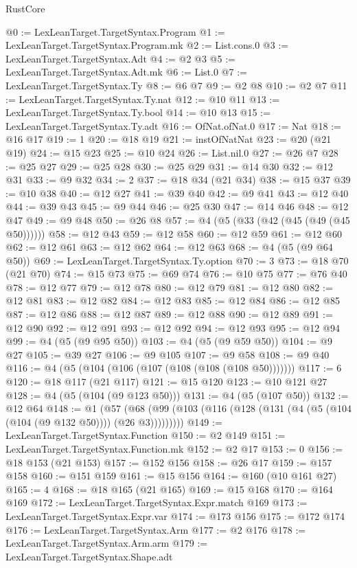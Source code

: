 \begin{lexlean}{RustCore}
\begin{coremodule}
@0 := LexLeanTarget.TargetSyntax.Program
@1 := LexLeanTarget.TargetSyntax.Program.mk
@2 := List.cons.{0}
@3 := LexLeanTarget.TargetSyntax.Adt
@4 := @2 @3
@5 := LexLeanTarget.TargetSyntax.Adt.mk
@6 := List.{0}
@7 := LexLeanTarget.TargetSyntax.Ty
@8 := @6 @7
@9 := @2 @8
@10 := @2 @7
@11 := LexLeanTarget.TargetSyntax.Ty.nat
@12 := @10 @11
@13 := LexLeanTarget.TargetSyntax.Ty.bool
@14 := @10 @13
@15 := LexLeanTarget.TargetSyntax.Ty.adt
@16 := OfNat.ofNat.{0}
@17 := Nat
@18 := @16 @17
@19 := 1
@20 := @18 @19
@21 := instOfNatNat
@23 := @20 (@21 @19)
@24 := @15 @23
@25 := @10 @24
@26 := List.nil.{0}
@27 := @26 @7
@28 := @25 @27
@29 := @25 @28
@30 := @25 @29
@31 := @14 @30
@32 := @12 @31
@33 := @9 @32
@34 := 2
@37 := @18 @34 (@21 @34)
@38 := @15 @37
@39 := @10 @38
@40 := @12 @27
@41 := @39 @40
@42 := @9 @41
@43 := @12 @40
@44 := @39 @43
@45 := @9 @44
@46 := @25 @30
@47 := @14 @46
@48 := @12 @47
@49 := @9 @48
@50 := @26 @8
@57 := @4 (@5 (@33 (@42 (@45 (@49 (@45 @50))))))
@58 := @12 @43
@59 := @12 @58
@60 := @12 @59
@61 := @12 @60
@62 := @12 @61
@63 := @12 @62
@64 := @12 @63
@68 := @4 (@5 (@9 @64 @50))
@69 := LexLeanTarget.TargetSyntax.Ty.option
@70 := 3
@73 := @18 @70 (@21 @70)
@74 := @15 @73
@75 := @69 @74
@76 := @10 @75
@77 := @76 @40
@78 := @12 @77
@79 := @12 @78
@80 := @12 @79
@81 := @12 @80
@82 := @12 @81
@83 := @12 @82
@84 := @12 @83
@85 := @12 @84
@86 := @12 @85
@87 := @12 @86
@88 := @12 @87
@89 := @12 @88
@90 := @12 @89
@91 := @12 @90
@92 := @12 @91
@93 := @12 @92
@94 := @12 @93
@95 := @12 @94
@99 := @4 (@5 (@9 @95 @50))
@103 := @4 (@5 (@9 @59 @50))
@104 := @9 @27
@105 := @39 @27
@106 := @9 @105
@107 := @9 @58
@108 := @9 @40
@116 := @4 (@5 (@104 (@106 (@107 (@108 (@108 (@108 @50)))))))
@117 := 6
@120 := @18 @117 (@21 @117)
@121 := @15 @120
@123 := @10 @121 @27
@128 := @4 (@5 (@104 (@9 @123 @50)))
@131 := @4 (@5 (@107 @50))
@132 := @12 @64
@148 := @1
    (@57 (@68 (@99 (@103 (@116 (@128 (@131 (@4 (@5 (@104 (@104 (@9 @132 @50)))) (@26 @3)))))))))
@149 := LexLeanTarget.TargetSyntax.Function
@150 := @2 @149
@151 := LexLeanTarget.TargetSyntax.Function.mk
@152 := @2 @17
@153 := 0
@156 := @18 @153 (@21 @153)
@157 := @152 @156
@158 := @26 @17
@159 := @157 @158
@160 := @151 @159
@161 := @15 @156
@164 := @160 (@10 @161 @27)
@165 := 4
@168 := @18 @165 (@21 @165)
@169 := @15 @168
@170 := @164 @169
@172 := LexLeanTarget.TargetSyntax.Expr.match @169
@173 := LexLeanTarget.TargetSyntax.Expr.var
@174 := @173 @156
@175 := @172 @174
@176 := LexLeanTarget.TargetSyntax.Arm
@177 := @2 @176
@178 := LexLeanTarget.TargetSyntax.Arm.arm
@179 := LexLeanTarget.TargetSyntax.Shape.adt

\end{coremodule}
\end{lexlean}
